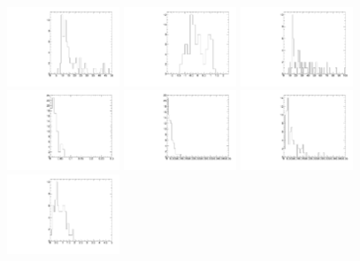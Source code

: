 \begin{figure}
  \centering
  \includegraphics[width=0.3\textwidth]{Figures/AfterBDTCut_pt_BarrelUnblinded.pdf}
  \includegraphics[width=0.3\textwidth]{Figures/AfterBDTCut_eta_BarrelUnblinded.pdf}
  \includegraphics[width=0.3\textwidth]{Figures/AfterBDTCut_fls3d_BarrelUnblinded.pdf}
  \includegraphics[width=0.3\textwidth]{Figures/AfterBDTCut_alpha_BarrelUnblinded.pdf}
  \includegraphics[width=0.3\textwidth]{Figures/AfterBDTCut_maxdoca_BarrelUnblinded.pdf}
  \includegraphics[width=0.3\textwidth]{Figures/AfterBDTCut_pvip_BarrelUnblinded.pdf}
  \includegraphics[width=0.3\textwidth]{Figures/AfterBDTCut_pvips_BarrelUnblinded.pdf}

\end{figure}
